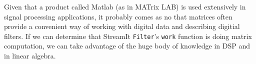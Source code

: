 Given that a product called Matlab (as in  MATrix LAB) is used extensively
in signal processing applications, it probably comes as no  that 
matrices often provide a convenient way of working with
digital data and describing digitial filters. If we can determine that StreamIt {\tt Filter}'s
{\tt work} function is doing matrix computation, we can take advantage of the huge body
of knowledge in DSP and in linear algebra.
